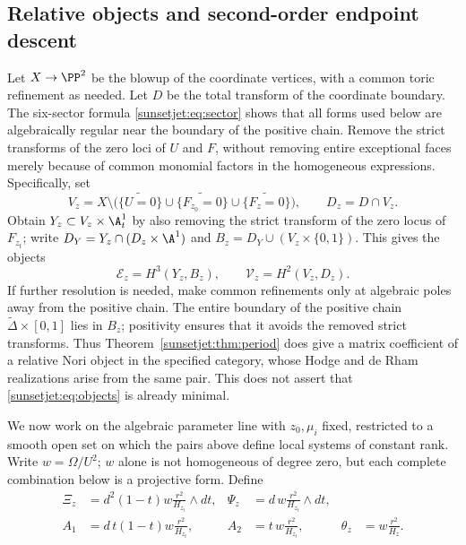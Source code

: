 \documentclass[11pt,a4paper,oneside]{article}
\theoremstyle{plain}
\theoremstyle{definition}
\theoremstyle{remark}
\numberwithin{equation}{section}
\begin{document}
\subsection{Relative objects and second-order endpoint descent}\label{sunsetjet:sec:motive}
Let $X\to\PP^2$ be the blowup of the coordinate vertices, with a common toric refinement as needed.
Let $D$ be the total transform of the coordinate boundary.
The six-sector formula \eqref{sunsetjet:eq:sector} shows that all forms used below are algebraically regular near the boundary of the positive chain.
Remove the strict transforms of the zero loci of $U$ and $F$, without removing entire exceptional faces merely because of common monomial factors in the homogeneous expressions.
Specifically, set
\[
 V_z=X\setminus\bigl(\widetilde{\{U=0\}}\cup
        \widetilde{\{F_{z_0}=0\}}\cup\widetilde{\{F_z=0\}}\bigr),
 \qquad D_z=D\cap V_z.
\]
Obtain $Y_z\subset V_z\times\A^1_t$ by also removing the strict transform of the zero locus of $F_{z_t}$;
write $D_Y=Y_z\cap(D_z\times\A^1)$ and
$B_z=D_Y\cup(V_z\times\{0,1\})$.
This gives the objects
\begin{equation}\label{sunsetjet:eq:objects}
 \mathcal E_z=H^3(Y_z,B_z),\qquad
 \mathcal V_z=H^2(V_z,D_z).
\end{equation}
If further resolution is needed, make common refinements only at algebraic poles away from the positive chain.
The entire boundary of the positive chain $\widetilde\Delta\times[0,1]$ lies in $B_z$;
positivity ensures that it avoids the removed strict transforms.
Thus Theorem~\ref{sunsetjet:thm:period} does give a matrix coefficient of a relative Nori object in the specified category,
whose Hodge and de Rham realizations arise from the same pair.
This does not assert that \eqref{sunsetjet:eq:objects} is already minimal.

We now work on the algebraic parameter line with $z_0,\mu_i$ fixed,
restricted to a smooth open set on which the pairs above define local systems of constant rank.
Write $w=\Omega/U^2$; $w$ alone is not homogeneous of degree zero,
but each complete combination below is a projective form.
Define
\begin{align}
 \Xi_z&=d^2(1-t)w\frac{r^2}{H_{z_t}}\wedge dt,&
 \Psi_z&=d\,w\frac{r^2}{H_{z_t}}\wedge dt,\label{sunsetjet:eq:forms}\\
 A_1&=d\,t(1-t)w\frac{r^2}{H_{z_t}},&
 A_2&=t\,w\frac{r^2}{H_{z_t}},&
 \theta_z&=w\frac{r^2}{H_z}.\label{sunsetjet:eq:primitives}
\end{align}
\end{document}
